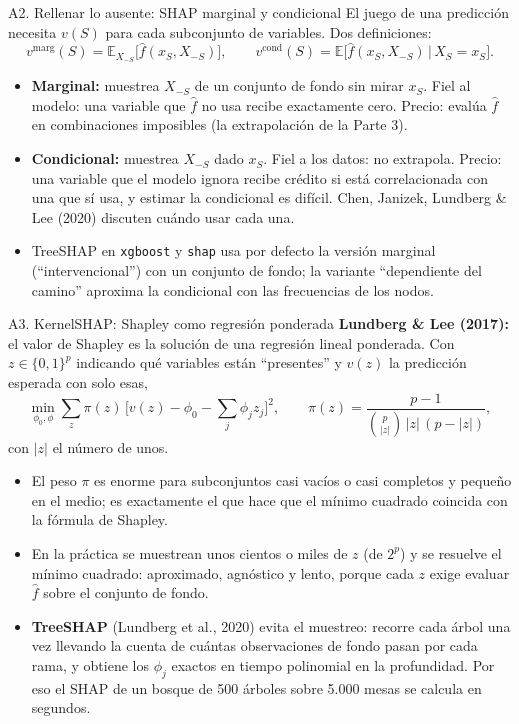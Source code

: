 \documentclass{beamer}
\newcommand{\E}{\mathbb{E}}
\newcommand{\1}{\mathbb{I}}
\begin{document}
\begin{frame}{A2. Rellenar lo ausente: SHAP marginal y condicional}
\small
El juego de una predicción necesita $v(S)$ para cada subconjunto de variables. Dos definiciones:
\[ v^{\text{marg}}(S) = \E_{X_{-S}}\big[\hat{f}(x_S, X_{-S})\big], \qquad v^{\text{cond}}(S) = \E\big[\hat{f}(x_S, X_{-S}) \,\big|\, X_S = x_S\big]. \]
\pause
\begin{itemize}\itemsep3pt
  \item \textbf{Marginal:} muestrea $X_{-S}$ de un conjunto de fondo sin mirar $x_S$. Fiel al modelo: una variable que $\hat{f}$ no usa recibe exactamente cero. Precio: evalúa $\hat{f}$ en combinaciones imposibles (la extrapolación de la Parte 3).
  \item \textbf{Condicional:} muestrea $X_{-S}$ dado $x_S$. Fiel a los datos: no extrapola. Precio: una variable que el modelo ignora recibe crédito si está correlacionada con una que sí usa, y estimar la condicional es difícil. Chen, Janizek, Lundberg \& Lee (2020) discuten cuándo usar cada una.
  \item TreeSHAP en \texttt{xgboost} y \texttt{shap} usa por defecto la versión marginal (``intervencional'') con un conjunto de fondo; la variante ``dependiente del camino'' aproxima la condicional con las frecuencias de los nodos.
\end{itemize}
\end{frame}

\begin{frame}{A3. KernelSHAP: Shapley como regresión ponderada}
\small
\textbf{Lundberg \& Lee (2017):} el valor de Shapley es la solución de una regresión lineal ponderada. Con $z \in \{0,1\}^p$ indicando qué variables están ``presentes'' y $v(z)$ la predicción esperada con solo esas,
\[ \min_{\phi_0, \phi} \sum_{z} \pi(z)\, \Big[ v(z) - \phi_0 - \sum_j \phi_j z_j \Big]^2, \qquad \pi(z) = \frac{p-1}{\binom{p}{|z|}\,|z|\,(p-|z|)}, \]
con $|z|$ el número de unos.
\pause
\begin{itemize}\itemsep3pt
  \item El peso $\pi$ es enorme para subconjuntos casi vacíos o casi completos y pequeño en el medio; es exactamente el que hace que el mínimo cuadrado coincida con la fórmula de Shapley.
  \item En la práctica se muestrean unos cientos o miles de $z$ (de $2^p$) y se resuelve el mínimo cuadrado: aproximado, agnóstico y lento, porque cada $z$ exige evaluar $\hat{f}$ sobre el conjunto de fondo.
  \item \textbf{TreeSHAP} (Lundberg et al., 2020) evita el muestreo: recorre cada árbol una vez llevando la cuenta de cuántas observaciones de fondo pasan por cada rama, y obtiene los $\phi_j$ exactos en tiempo polinomial en la profundidad. Por eso el SHAP de un bosque de 500 árboles sobre 5.000 mesas se calcula en segundos.
\end{itemize}
\end{frame}
\end{document}
